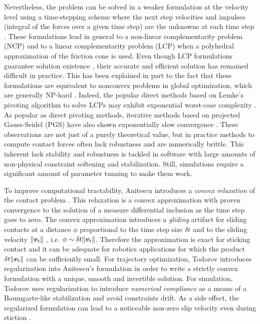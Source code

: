 Nevertheless, the problem can be solved in a weaker formulation at the velocity
level using a time-stepping scheme where the next step velocities and impulses
(integral of the forces over a given time step) are the unknowns at each time
step \cite{bib:stewart1996implicit, bib:anitescu1997}. These formulations lead
in general to a non-linear complementarity problem (NCP) and to a linear
complementarity problem (LCP) when a polyhedral approximation of the friction
cone is used. Even though LCP formulations guarantee solution existence
\cite{bib:anitescu1997, bib:stewart1998convergence}, their accurate and
efficient solution has remained difficult in practice. This has been explained
in part to the fact that these formulations are equivalent to nonconvex problems
in global optimization, which are generally NP-hard \cite{bib:Kaufman2008}.
Indeed, the popular direct methods based on Lemke's pivoting algorithm to solve
LCPs may exhibit exponential worst-case complexity \cite{bib:baraff1994fast}. As
popular as direct pivoting methods, iterative methods based on projected
Gauss-Seidel (PGS) \cite{bib:duriez2006_realistic_haptic_rendering, bib:bullet}
have also shown exponentially slow convergence \cite{bib:erleben2007velocity}.
These observations are not just of a purely theoretical value, but in practice
methods to compute contact forces often lack robustness and are numerically
brittle. This inherent lack stability and robustness is tackled in software with
large amounts of non-physical constraint softening and stabilization. Still,
simulations require a significant amount of parameter tunning to make them
work.


To improve computational tractability, Anitescu introduces a \textit{convex
relaxation} of the contact problem \cite{bib:anitescu2006}. This relaxation is a
convex approximation with proven convergence to the solution of a measure
differential inclusion as the time step goes to zero. The convex approximation
introduces a \emph{gliding} artifact for sliding contacts at a distance $\phi$
proportional to the time step size $\delta t$ and to the sliding velocity
$\Vert{\bm{v}}_t\Vert$ \cite{bib:mazhar2014}, i.e. $\phi\sim \delta
t\Vert{\bm{v}}_t\Vert$. Therefore the approximation is exact for sticking contact
and it can be adequate for robotics applications for which the
product $\delta t\Vert{\bm{v}}_t\Vert$ can be sufficiently small. For trajectory
optimization, Todorov \cite{bib:todorov2011} introduces regularization into
Anitescu's formulation in order to write a strictly convex formulation with a
unique, smooth and invertible solution. For simulation, Todorov
\cite{bib:todorov2014} uses regularization to introduce \emph{numerical
compliance} as a means of a Baumgarte-like stabilization and avoid constraints
drift. As a side effect, the regularized formulation can lead to a noticeable
non-zero slip velocity even during stiction \cite{bib:simbenchmark}.

